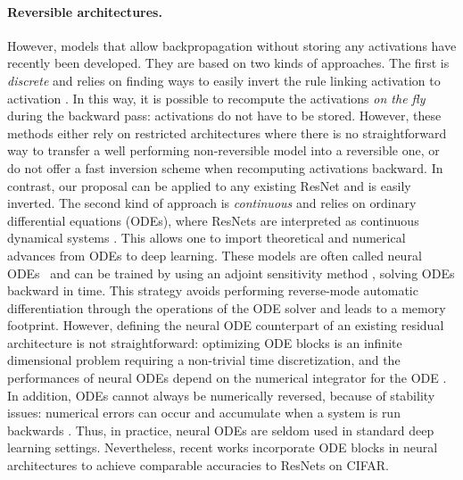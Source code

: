 \documentclass{article}
\begin{document}
\paragraph{Reversible architectures.}
However, models that allow backpropagation without storing any activations have recently been developed. They are based on two kinds of approaches.
The first is \textit{discrete} and relies on finding ways to easily invert the rule linking activation  to activation  \citep{gomez2017reversible,chang2017reversible,Haber_2017,jacobsen2018irevnet, behrmann2019invertible}.
In this way, it is possible to recompute the activations \emph{on the fly} during the backward pass: activations do not have to be stored.
However, these methods either rely on restricted architectures where there is no straightforward way to transfer a well performing non-reversible model into a reversible one, or do not offer a fast inversion scheme when recomputing activations backward. In contrast, our proposal can be applied to any existing ResNet and is easily inverted.
The second kind of approach is \textit{continuous} and
relies on ordinary differential equations (ODEs), where ResNets are interpreted as continuous dynamical systems \citep{E_2017,chen2018neural,dupont2019augmented,sun2018stochastic,E_2018,lu2017finite,ruthotto2018deep}. This allows one to import theoretical and numerical advances from ODEs to deep learning.
These models are often called neural ODEs~\citep{chen2018neural} and can be trained by using an adjoint sensitivity method \citep{Pontryagin:234445}, solving ODEs backward in time. This strategy avoids performing reverse-mode automatic differentiation 
through the operations of the ODE solver and leads to a  memory footprint.
However, defining the neural ODE counterpart of an existing residual architecture is not straightforward: optimizing ODE blocks is an infinite dimensional problem requiring a non-trivial time discretization, and the performances of neural ODEs depend on the numerical integrator for the ODE \citep{gusak2020towards}.
In  addition, ODEs cannot always be numerically reversed, because of stability issues: numerical errors can occur and accumulate when a system is run backwards \citep{gholami2019anode, dupont2019augmented}. Thus, in practice, neural ODEs are seldom used in standard deep learning settings.  Nevertheless, recent works \citep{zhang2019anodev2, queiruga2020continuous} incorporate ODE blocks in neural architectures to achieve comparable accuracies to ResNets on CIFAR.
\end{document}
